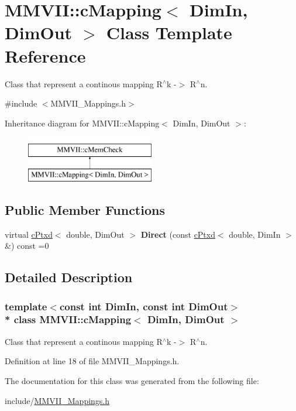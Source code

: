 \hypertarget{classMMVII_1_1cMapping}{}\section{M\+M\+V\+II\+:\+:c\+Mapping$<$ Dim\+In, Dim\+Out $>$ Class Template Reference}
\label{classMMVII_1_1cMapping}


Class that represent a continous mapping R$^\wedge$k -\/$>$ R$^\wedge$n.  




{\ttfamily \#include $<$M\+M\+V\+I\+I\+\_\+\+Mappings.\+h$>$}

Inheritance diagram for M\+M\+V\+II\+:\+:c\+Mapping$<$ Dim\+In, Dim\+Out $>$\+:\begin{figure}[H]
\begin{center}
\leavevmode
\includegraphics[height=2.000000cm]{classMMVII_1_1cMapping}
\end{center}
\end{figure}
\subsection*{Public Member Functions}
\begin{DoxyCompactItemize}
\item 
virtual \hyperlink{classMMVII_1_1cPtxd}{c\+Ptxd}$<$ double, Dim\+Out $>$ {\bfseries Direct} (const \hyperlink{classMMVII_1_1cPtxd}{c\+Ptxd}$<$ double, Dim\+In $>$ \&) const =0\hypertarget{classMMVII_1_1cMapping_a3c3384063dcaf2044beb240602573b0e}{}\label{classMMVII_1_1cMapping_a3c3384063dcaf2044beb240602573b0e}

\end{DoxyCompactItemize}


\subsection{Detailed Description}
\subsubsection*{template$<$const int Dim\+In, const int Dim\+Out$>$\\*
class M\+M\+V\+I\+I\+::c\+Mapping$<$ Dim\+In, Dim\+Out $>$}

Class that represent a continous mapping R$^\wedge$k -\/$>$ R$^\wedge$n. 

Definition at line 18 of file M\+M\+V\+I\+I\+\_\+\+Mappings.\+h.



The documentation for this class was generated from the following file\+:\begin{DoxyCompactItemize}
\item 
include/\hyperlink{MMVII__Mappings_8h}{M\+M\+V\+I\+I\+\_\+\+Mappings.\+h}\end{DoxyCompactItemize}
